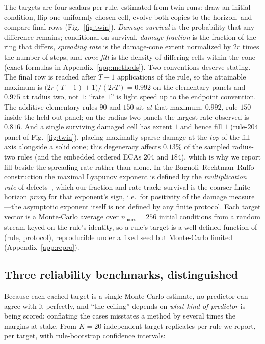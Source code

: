 \documentclass[aip,cha,amsmath,amssymb,reprint,floatfix]{revtex4-2}
\begin{document}
The targets are four scalars per rule, estimated from twin runs: draw an
initial condition, flip one uniformly chosen cell, evolve both copies to the
horizon, and compare final rows (Fig.~\ref{fig:twin}). \emph{Damage survival} is the probability that
any difference remains; conditional on survival, \emph{damage fraction} is the
fraction of the ring that differs, \emph{spreading rate} is the damage-cone
extent normalized by $2r$ times the number of steps, and \emph{cone fill} is
the density of differing cells within the cone (exact formulas in
Appendix~\ref{app:methods}). Two conventions deserve stating. The final row
is reached after $T-1$ applications of the rule, so the attainable maximum
is $\bigl(2r(T-1)+1\bigr)/(2rT)=0.992$ on the elementary panels and $0.975$
at radius two, not $1$: ``rate $1$'' is light speed up to the endpoint
convention. The additive elementary rules $90$ and $150$ sit \emph{at} that
maximum, $0.992$, rule $150$ inside the held-out panel; on the radius-two
panels the largest rate observed is $0.816$. And a single surviving damaged cell has extent $1$ and hence fill
$1$ (rule-$204$ panel of Fig.~\ref{fig:twin}), placing maximally sparse
damage at the \emph{top} of the fill axis
alongside a solid cone; this degeneracy affects $0.13\%$ of the sampled
radius-two rules (and the embedded ordered ECAs $204$ and $184$), which is why
we report fill beside the spreading rate rather than alone. In the
Bagnoli--Rechtman--Ruffo construction the maximal Lyapunov exponent is defined
by the \emph{multiplication rate} of defects~\cite{bagnoli1992,baetens2010},
which our fraction and rate track; survival is the coarser finite-horizon
\emph{proxy} for that exponent's sign, i.e.\ for positivity of the damage
measure---the asymptotic exponent itself is not defined by any finite
protocol. Each target vector is a
Monte-Carlo average over $n_{\mathrm{pairs}}=256$ initial conditions from a
random stream keyed on the rule's identity, so a rule's target is a
well-defined function of (rule, protocol), reproducible under a fixed seed but
Monte-Carlo limited (Appendix~\ref{app:repro}).

\subsection{Three reliability benchmarks, distinguished}
\label{sec:reliability}
Because each cached target is a single Monte-Carlo estimate, no predictor
can agree with it perfectly, and ``the ceiling'' depends on \emph{what kind
of predictor} is being scored: conflating the cases misstates a method by
several times the margins at stake. From $K=20$ independent target
replicates per rule we report, per target, with rule-bootstrap confidence
intervals:
\end{document}
